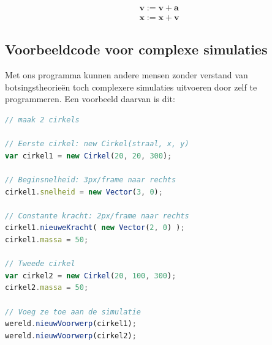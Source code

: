 \documentclass[12pt,a4paper]{article}
\begin{document}
	\begin{equation}
		\begin{aligned}
			\mathbf{v} := \mathbf{v} + \mathbf{a} \\
			\mathbf{x} := \mathbf{x} + \mathbf{v}
		\end{aligned}
	\end{equation}
	
	\subsection{Voorbeeldcode voor complexe simulaties}
	Met ons programma kunnen andere mensen zonder verstand van botsingstheorie\"{e}n toch complexere simulaties uitvoeren door zelf te programmeren. Een voorbeeld daarvan is dit:
	
	\begin{lstlisting}[language=Javascript, caption={Twee cirkels, met een constante kracht op de eerste}]
// maak 2 cirkels

// Eerste cirkel: new Cirkel(straal, x, y)
var cirkel1 = new Cirkel(20, 20, 300);

// Beginsnelheid: 3px/frame naar rechts
cirkel1.snelheid = new Vector(3, 0);

// Constante kracht: 2px/frame naar rechts   
cirkel1.nieuweKracht( new Vector(2, 0) ); 
cirkel1.massa = 50;

// Tweede cirkel
var cirkel2 = new Cirkel(20, 100, 300);
cirkel2.massa = 50;

// Voeg ze toe aan de simulatie
wereld.nieuwVoorwerp(cirkel1);
wereld.nieuwVoorwerp(cirkel2);
	\end{lstlisting}
\end{document}
